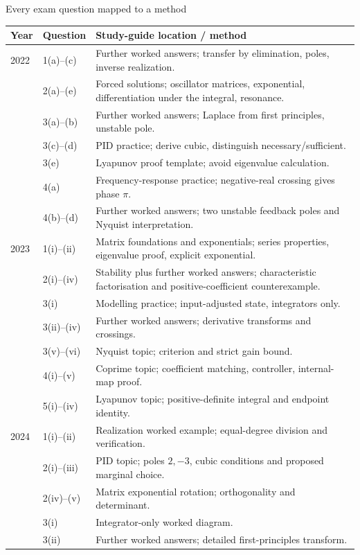 \begin{concept}{Every exam question mapped to a method}
\small
\begin{tabular}{p{.13\linewidth}p{.19\linewidth}p{.59\linewidth}}
\toprule Year&Question&Study-guide location / method\\\midrule
2022&1(a)--(c)&Further worked answers; transfer by elimination, poles, inverse realization.\\
&2(a)--(e)&Forced solutions; oscillator matrices, exponential, differentiation under the integral, resonance.\\
&3(a)--(b)&Further worked answers; Laplace from first principles, unstable pole.\\
&3(c)--(d)&PID practice; derive cubic, distinguish necessary/sufficient.\\
&3(e)&Lyapunov proof template; avoid eigenvalue calculation.\\
&4(a)&Frequency-response practice; negative-real crossing gives phase $\pi$.\\
&4(b)--(d)&Further worked answers; two unstable feedback poles and Nyquist interpretation.\\\midrule
2023&1(i)--(ii)&Matrix foundations and exponentials; series properties, eigenvalue proof, explicit exponential.\\
&2(i)--(iv)&Stability plus further worked answers; characteristic factorisation and positive-coefficient counterexample.\\
&3(i)&Modelling practice; input-adjusted state, integrators only.\\
&3(ii)--(iv)&Further worked answers; derivative transforms and crossings.\\
&3(v)--(vi)&Nyquist topic; criterion and strict gain bound.\\
&4(i)--(v)&Coprime topic; coefficient matching, controller, internal-map proof.\\
&5(i)--(iv)&Lyapunov topic; positive-definite integral and endpoint identity.\\\midrule
2024&1(i)--(ii)&Realization worked example; equal-degree division and verification.\\
&2(i)--(iii)&PID topic; poles $2,-3$, cubic conditions and proposed marginal choice.\\
&2(iv)--(v)&Matrix exponential rotation; orthogonality and determinant.\\
&3(i)&Integrator-only worked diagram.\\
&3(ii)&Further worked answers; detailed first-principles transform.\\

\end{tabular}
\end{concept}
